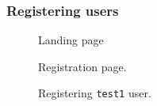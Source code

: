 \documentclass{article}
\begin{document}
		\subsubsection{Registering users}

		\begin{figure}[H]
			\centering
			\caption{Landing page}
			\label{fig:eval-prep-1}
		\end{figure}

		\begin{figure}[H]
			\centering
			\caption{Registration page.}
			\label{fig:eval-prep-2}
		\end{figure}

		\begin{figure}[H]
			\centering
			\caption{Registering \texttt{test1} user.}
			\label{fig:eval-prep-3}
		\end{figure}
\end{document}
